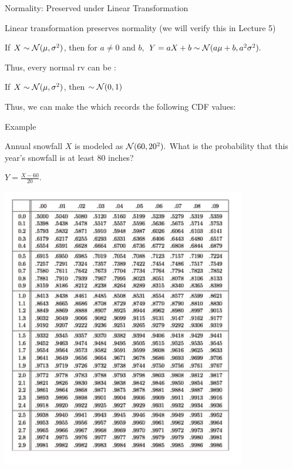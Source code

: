 \begin{frame}{Normality: Preserved under Linear Transformation}

\plitemsep 0.1in
\bci
\item<2-> Linear transformation preserves normality (we will verify this in Lecture 5)

\mycolorbox
{
If $X \sim  \mathcal N(\mu, \sigma^2) $, then for $a \neq 0$ and $b,$ $Y = aX +b \sim \mathcal N(a\mu +b,a^2 \sigma^2).$
}

\item<3-> Thus, every normal rv can be :

If $X \sim  \mathcal N(\mu, \sigma^2)$, then
 $\sim \mathcal N(0,1)$

\item<5-> Thus, we can make the  which records the following CDF values:


\eci
\end{frame}

\begin{frame}{Example}

\medskip

{
\plitemsep 0.1in
\bci
\item<1-> Annual snowfall $X$ is modeled as $\mathcal N(60,20^2).$ What is the probability that this year's snowfall is at least 80 inches?

\item<2-> $Y = \frac{X-60}{20}.$
\eci
}
{
\includegraphics[width=0.8\textwidth]{L4_normal_table.png}
}
\end{frame}



